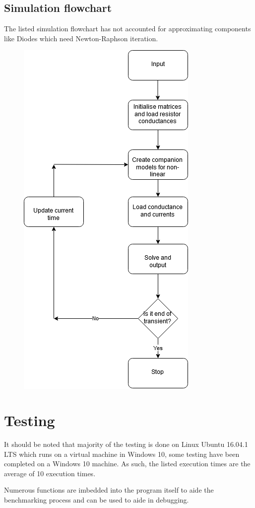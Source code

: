 \documentclass[12pt,a4paper]{article}
\begin{document}
	\subsection{Simulation flowchart} 
	The listed simulation flowchart has not accounted for approximating components like Diodes which need Newton-Raphson 
	iteration.
	\begin{figure} [h!]
		\centering
		\includegraphics[scale=0.5]{simulate.PNG} 
	\end{figure} 
\pagebreak

\section{Testing}
It should be noted that majority of the testing is done on Linux Ubuntu 16.04.1 LTS which runs on a virtual machine in Windows 10,
some testing have been completed on a Windows 10 machine. As such, the listed execution times are the average of 10 execution
times. \par 
Numerous functions are imbedded into the program itself to aide the benchmarking process and can be used to aide in debugging.
\pagebreak
\end{document}
